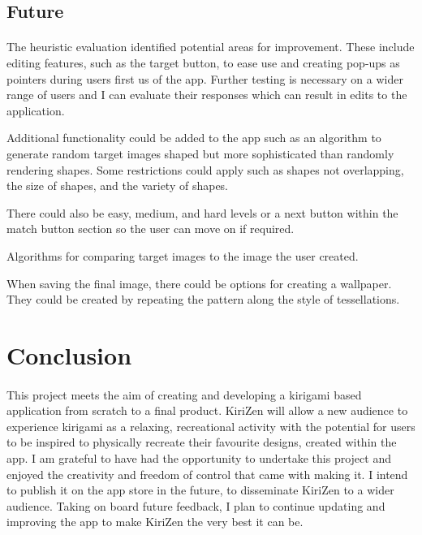 \documentclass[11pt]{article}
\begin{document}
    \subsection{Future}
                \paragraph{}
                
                The heuristic evaluation identified potential areas for improvement. These include editing features, such as the target button, to ease use and creating pop-ups as pointers during users first us of the app. Further testing is necessary on a wider range of users and I can evaluate their responses which can result in edits to the application. 
                
                Additional functionality could be added to the app such as an algorithm to generate random target images shaped but more sophisticated than randomly rendering shapes. Some restrictions could apply such as shapes not overlapping, the size of shapes, and the variety of shapes.
                
                There could also be easy, medium, and hard levels or a next button within the match button section so the user can move on if required. 
                
                Algorithms for comparing target images to the image the user created.

                When saving the final image, there could be options for creating a wallpaper. They could be created by repeating the pattern
                along the style of tessellations. 

\newpage
\section{Conclusion}
        
            \paragraph{}
            This project meets the aim of creating and developing a kirigami based application from scratch to a final product. KiriZen will allow a new audience to experience kirigami as a relaxing, recreational activity with the potential for users to be inspired to physically recreate their favourite designs, created within the app. I am grateful to have had the opportunity to undertake this project and enjoyed the creativity and freedom of control that came with making it. I intend to publish it on the app store in the future, to disseminate KiriZen to a wider audience. Taking on board future feedback, I plan to continue updating and improving the app to make KiriZen the very best it can be.
\end{document}
